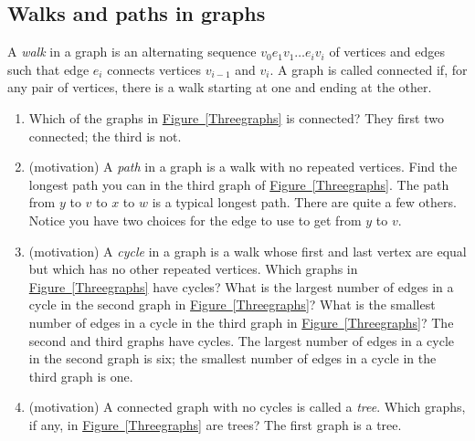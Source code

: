 \documentclass[10pt,]{book}
\theoremstyle{plain}
\theoremstyle{definition}
\numberwithin{equation}{chapter}
\begin{document}
\subsection[{Walks and paths in graphs}]{Walks and paths in graphs}\label{subsection-16}
A \emph{walk} in a graph is an alternating sequence \(v_0e_1v_1\ldots
e_iv_i\) of vertices and edges such that edge \(e_i\) connects vertices \(v_{i-1}\) and \(v_i\). A graph is called connected if, for any pair of vertices, there is a walk starting at one and ending at the other. \leavevmode%
\begin{enumerate}
{\setcounter{enumi}{\value{problemnumber}}} \item\hypertarget{connectedanddisconnected}{}Which of the graphs in \hyperref[Threegraphs]{Figure~\ref{Threegraphs}} is connected? They first two connected; the third is not.%
%
\item\hypertarget{li-23}{}(motivation) A \emph{path} in a graph is a walk with no repeated vertices.  Find the longest path you can in the third graph of \hyperref[Threegraphs]{Figure~\ref{Threegraphs}}. The path from \(y\) to \(v\) to \(x\) to \(w\) is a typical longest path. There are quite a few others. Notice you have two choices for the edge to use to get from \(y\) to \(v\).%
%
\item\hypertarget{li-24}{}(motivation) A \emph{cycle} in a graph is a walk whose first and last vertex are equal but which has no other repeated vertices.  Which graphs in \hyperref[Threegraphs]{Figure~\ref{Threegraphs}} have cycles?  What is the largest number of edges in a cycle in the second graph in \hyperref[Threegraphs]{Figure~\ref{Threegraphs}}?  What is the smallest number of edges in a cycle in the third graph in \hyperref[Threegraphs]{Figure~\ref{Threegraphs}}? The second and third graphs have cycles. The largest number of edges in a cycle in the second graph is six; the smallest number of edges in a cycle in the third graph is one.%
%
\item\hypertarget{li-25}{}(motivation) A connected graph with no cycles is called a \emph{tree}.  Which graphs, if any, in \hyperref[Threegraphs]{Figure~\ref{Threegraphs}} are trees? The first graph is a tree.%
 \setcounter{problemnumber}{\value{enumi}}%
\end{enumerate}
%
\typeout{************************************************}
\typeout{************************************************}
\end{document}

